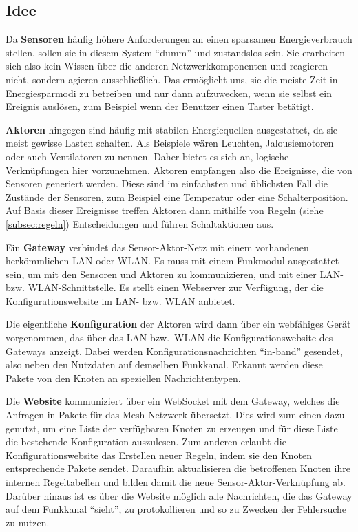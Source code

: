 \documentclass[conference]{IEEEtran}
\begin{document}
    \subsection{Idee}
        Da \textbf{Sensoren} häufig höhere Anforderungen an einen sparsamen
        Energieverbrauch stellen, sollen sie in diesem System \enquote{dumm} und zustandslos sein.
        Sie erarbeiten sich also kein Wissen über die anderen Netzwerkkomponenten
        und reagieren nicht, sondern agieren ausschließlich.
        Das ermöglicht uns, sie die meiste Zeit in Energiesparmodi zu betreiben
        und nur dann aufzuwecken, wenn sie selbst ein Ereignis auslösen,
        zum Beispiel wenn der Benutzer einen Taster betätigt.

        \textbf{Aktoren} hingegen sind häufig mit stabilen Energiequellen
        ausgestattet, da sie meist gewisse Lasten schalten.
        Als Beispiele wären Leuchten, Jalousiemotoren oder auch Ventilatoren
        zu nennen.
        Daher bietet es sich an, logische Verknüpfungen hier vorzunehmen.
        Aktoren empfangen also die Ereignisse, die von Sensoren generiert werden.
        Diese sind im einfachsten und üblichsten Fall die Zustände
        der Sensoren, zum Beispiel eine Temperatur oder eine Schalterposition.
        Auf Basis dieser Ereignisse treffen Aktoren dann mithilfe von
        Regeln (siehe \ref{subsec:regeln}) Entscheidungen und führen Schaltaktionen aus.

        Ein \textbf{Gateway} verbindet das Sensor-Aktor-Netz mit einem
        vorhandenen herkömmlichen \ac{LAN} oder \ac{WLAN}.
        Es muss mit einem Funkmodul ausgestattet sein,
        um mit den Sensoren und Aktoren zu kommunizieren,
        und mit einer \ac{LAN}- bzw. \ac{WLAN}-Schnittstelle.
        Es stellt einen Webserver zur Verfügung,
        der die Konfigurationswebsite im \ac{LAN}- bzw. \ac{WLAN} anbietet.

        Die eigentliche \textbf{Konfiguration} der Aktoren wird dann
        über ein webfähiges Gerät vorgenommen,
        das über das \ac{LAN} bzw.\ \ac{WLAN} die
        Konfigurationswebsite des Gateways anzeigt.
        Dabei werden Konfigurationsnachrichten \enquote{in-band} gesendet,
        also neben den Nutzdaten auf demselben Funkkanal. Erkannt werden
        diese Pakete von den Knoten an speziellen Nachrichtentypen.
        
        Die \textbf{Website} kommuniziert über ein WebSocket mit dem Gateway,
        welches die Anfragen in Pakete für das Mesh-Netzwerk übersetzt.
        Dies wird zum einen dazu genutzt,
        um eine Liste der verfügbaren Knoten zu erzeugen und für diese
        Liste die bestehende Konfiguration auszulesen. Zum anderen erlaubt die Konfigurationswebsite
        das Erstellen neuer Regeln, indem sie den Knoten entsprechende Pakete sendet.
        Daraufhin aktualisieren die betroffenen Knoten ihre internen Regeltabellen und bilden
        damit die neue Sensor-Aktor-Verknüpfung ab.
        Darüber hinaus ist es über die Website möglich alle Nachrichten,
        die das Gateway auf dem Funkkanal \enquote{sieht},
        zu protokollieren und so zu Zwecken der Fehlersuche zu nutzen.
\end{document}
